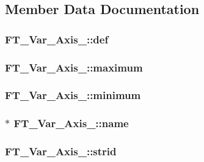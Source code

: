 \subsection{Member Data Documentation}
\hypertarget{struct_f_t___var___axis___a37a6ca4188a6bfd95d9d06538bf1a3dd}{
\subsubsection[{def}]{ F\-T\-\_\-\-Var\-\_\-\-Axis\-\_\-\-::def}}\label{struct_f_t___var___axis___a37a6ca4188a6bfd95d9d06538bf1a3dd}
\hypertarget{struct_f_t___var___axis___a5704641439e9f318cf3c2b73864e3260}{
\subsubsection[{maximum}]{ F\-T\-\_\-\-Var\-\_\-\-Axis\-\_\-\-::maximum}}\label{struct_f_t___var___axis___a5704641439e9f318cf3c2b73864e3260}
\hypertarget{struct_f_t___var___axis___aae13a8dea1c96bc3949019e8117e7edb}{
\subsubsection[{minimum}]{ F\-T\-\_\-\-Var\-\_\-\-Axis\-\_\-\-::minimum}}\label{struct_f_t___var___axis___aae13a8dea1c96bc3949019e8117e7edb}
\hypertarget{struct_f_t___var___axis___a8d0e0af322a692999ec3733a3e18a5a4}{
\subsubsection[{name}]{$\ast$ F\-T\-\_\-\-Var\-\_\-\-Axis\-\_\-\-::name}}\label{struct_f_t___var___axis___a8d0e0af322a692999ec3733a3e18a5a4}
\hypertarget{struct_f_t___var___axis___a297d28ab0f5666e56d7575249ccc75d7}{
\subsubsection[{strid}]{ F\-T\-\_\-\-Var\-\_\-\-Axis\-\_\-\-::strid}}\label{struct_f_t___var___axis___a297d28ab0f5666e56d7575249ccc75d7}
